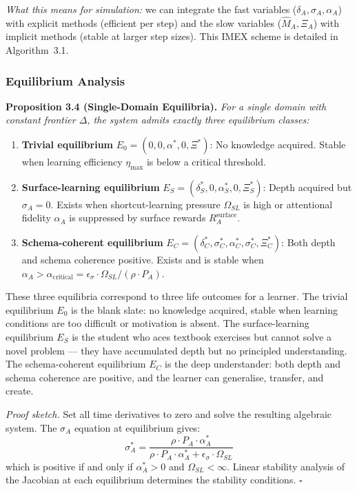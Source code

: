 \noindent\textit{What this means for simulation:} we can integrate the fast
variables ($\delta_A, \sigma_A, \alpha_A$) with explicit methods (efficient
per step) and the slow variables ($\hat{M}_A, \Xi_A$) with implicit methods
(stable at larger step sizes). This IMEX scheme is detailed in
Algorithm~3.1.

\subsubsection{Equilibrium Analysis}\label{sec:equilibrium}

\textbf{Proposition 3.4 (Single-Domain Equilibria).} %
\textit{For a single domain with constant frontier $\Delta$, the system
admits exactly three equilibrium classes:}
\begin{enumerate}[nosep]
\item \textbf{Trivial equilibrium} $E_0 = (0, 0, \alpha^*, 0, \Xi^*)$: No knowledge acquired. Stable when learning efficiency $\eta_{\max}$ is below a critical threshold.
\item \textbf{Surface-learning equilibrium} $E_S = (\delta_S^*, 0, \alpha_S^*, 0, \Xi_S^*)$: Depth acquired but $\sigma_A = 0$. Exists when shortcut-learning pressure $\Omega_{SL}$ is high or attentional fidelity $\alpha_A$ is suppressed by surface rewards $R_A^{\text{surface}}$.
\item \textbf{Schema-coherent equilibrium} $E_C = (\delta_C^*, \sigma_C^*, \alpha_C^*, \sigma_C^*, \Xi_C^*)$: Both depth and schema coherence positive. Exists and is stable when $\alpha_A > \alpha_{\text{critical}} = \epsilon_\sigma \cdot \Omega_{SL} / (\rho \cdot P_A)$.
\end{enumerate}

These three equilibria correspond to three life outcomes for a learner. The trivial equilibrium $E_0$ is the blank slate: no knowledge acquired, stable when learning conditions are too difficult or motivation is absent. The surface-learning equilibrium $E_S$ is the student who aces textbook exercises but cannot solve a novel problem --- they have accumulated depth but no principled understanding. The schema-coherent equilibrium $E_C$ is the deep understander: both depth and schema coherence are positive, and the learner can generalise, transfer, and create.

\textit{Proof sketch.} Set all time derivatives to zero and solve the
resulting algebraic system. The $\sigma_A$ equation at equilibrium gives:
\begin{equation}\label{eq:sigma-equilibrium}
\sigma_A^* = \frac{\rho \cdot P_A \cdot \alpha_A^*}{\rho \cdot P_A \cdot \alpha_A^* + \epsilon_\sigma \cdot \Omega_{SL}}
\end{equation}
which is positive if and only if $\alpha_A^* > 0$ and $\Omega_{SL} < \infty$.
Linear stability analysis of the Jacobian at each equilibrium determines
the stability conditions. $\square$

